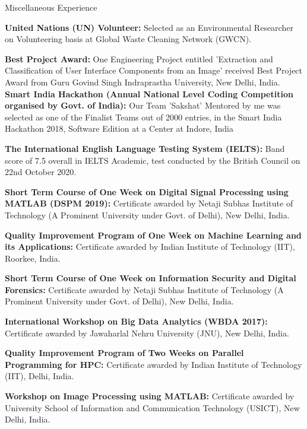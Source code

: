 
\begin{rubric}{Miscellaneous Experience}
    
    \entry*[2020] \textbf{United Nations (UN) Volunteer:} Selected as an Environmental Researcher on Volunteering basis at Global Waste Cleaning Network (GWCN).

    \entry*[2018] \textbf{Best Project Award:} One Engineering Project entitled 'Extraction and Classification of User Interface Components from an Image' received Best Project Award from Guru Govind Singh Indraprastha University, New Delhi, India.
    \entry*[2018] \textbf{Smart India Hackathon (Annual National Level Coding Competition organised by Govt. of India):} Our Team 'Sakshat' Mentored by me was selected as one of the Finalist Teams out of 2000 entries, in the Smart India Hackathon 2018, Software Edition at a Center at Indore, India
    

    \entry*[2020] \textbf{The International English Language Testing System (IELTS):} Band score of 7.5 overall in IELTS Academic, test conducted by the British Council on 22nd October 2020.

    \entry*[2019] \textbf{Short Term Course of One Week on Digital Signal Processing using MATLAB (DSPM 2019):} Certificate awarded by Netaji Subhas Institute of Technology (A Prominent University under Govt. of Delhi), New Delhi, India.
    
    \entry*[2018] \textbf{Quality Improvement Program of One Week on Machine Learning and its Applications:} Certificate awarded by Indian Institute of Technology (IIT), Roorkee, India.
    
    \entry*[2017] \textbf{Short Term Course of One Week on Information Security and Digital Forensics:} Certificate awarded by Netaji Subhas Institute of Technology (A Prominent University under Govt. of Delhi), New Delhi, India.
    
    \entry*[2017] \textbf{International Workshop on Big Data Analytics (WBDA 2017):} Certificate awarded by Jawaharlal Nehru University (JNU), New Delhi, India.
    
    \entry*[2016] \textbf{Quality Improvement Program of Two Weeks on Parallel Programming for HPC:} Certificate awarded by Indian Institute of Technology (IIT), Delhi, India.
    
    \entry*[2016] \textbf{Workshop on Image Processing using MATLAB:} Certificate awarded by University School of Information and Communication Technology (USICT), New Delhi, India.
    

\end{rubric}
